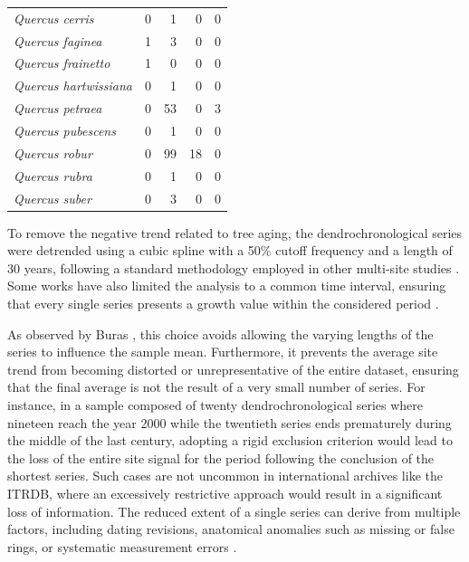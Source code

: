 \documentclass[12pt, a4paper]{article}
\begin{document}
\begin{table}[!ht]
\begin{tabular}{lrrrr}
  \textit{Quercus cerris}            &   0 &   1 &   0 &   0 \\ 
  \textit{Quercus faginea}           &   1 &   3 &   0 &   0 \\ 
  \textit{Quercus frainetto}         &   1 &   0 &   0 &   0 \\ 
  \textit{Quercus hartwissiana}      &   0 &   1 &   0 &   0 \\ 
  \textit{Quercus petraea}           &   0 &  53 &   0 &   3 \\ 
  \textit{Quercus pubescens}         &   0 &   1 &   0 &   0 \\ 
  \textit{Quercus robur}             &   0 &  99 &  18 &   0 \\ 
  \textit{Quercus rubra}             &   0 &   1 &   0 &   0 \\ 
  \textit{Quercus suber}             &   0 &   3 &   0 &   0 \\ 
  \bottomrule
\end{tabular}
\end{table}


To remove the negative trend related to tree aging, the dendrochronological series were detrended using a cubic spline with a 50\% cutoff frequency and a length of 30 years, following a standard methodology employed in other multi-site studies \parencite{tokarska-osyczka2025, klesse2019, bhuyan2017}. Some works have also limited the analysis to a common time interval, ensuring that every single series presents a growth value within the considered period \parencite{alzeley2023, camarero2024, vieira2021}.

As observed by Buras \parencite{buras2022}, this choice avoids allowing the varying lengths of the series to influence the sample mean. Furthermore, it prevents the average site trend from becoming distorted or unrepresentative of the entire dataset, ensuring that the final average is not the result of a very small number of series. For instance, in a sample composed of twenty dendrochronological series where nineteen reach the year 2000 while the twentieth series ends prematurely during the middle of the last century, adopting a rigid exclusion criterion would lead to the loss of the entire site signal for the period following the conclusion of the shortest series. Such cases are not uncommon in international archives like the ITRDB, where an excessively restrictive approach would result in a significant loss of information. The reduced extent of a single series can derive from multiple factors, including dating revisions, anatomical anomalies such as missing or false rings, or systematic measurement errors \parencite{speer2010}.
\end{document}
